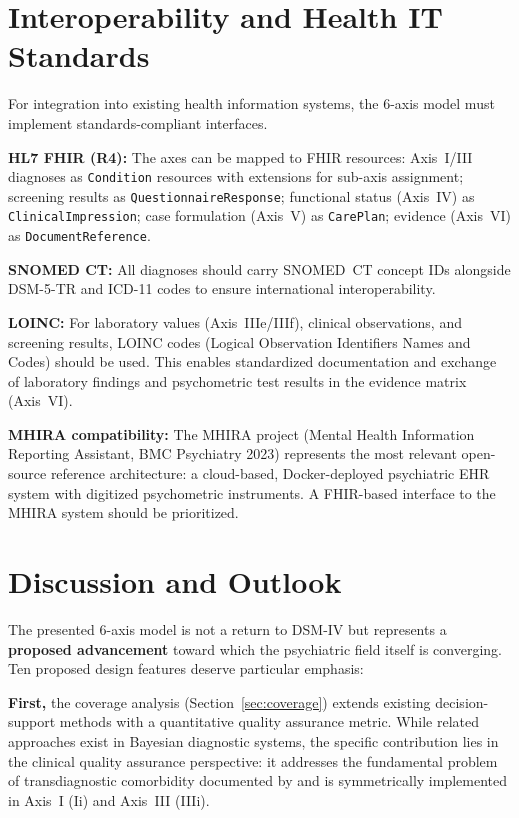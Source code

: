 \documentclass[11pt,a4paper]{article}
\begin{document}
\section{Interoperability and Health IT Standards}
\label{sec:interop}

For integration into existing health information systems, the 6-axis model must implement standards-compliant interfaces.

\textbf{HL7 FHIR (R4):} The axes can be mapped to FHIR resources: Axis~I/III diagnoses as \texttt{Condition} resources with extensions for sub-axis assignment; screening results as \texttt{QuestionnaireResponse}; functional status (Axis~IV) as \texttt{ClinicalImpression}; case formulation (Axis~V) as \texttt{CarePlan}; evidence (Axis~VI) as \texttt{DocumentReference}.

\textbf{SNOMED CT:} All diagnoses should carry SNOMED~CT concept IDs alongside DSM-5-TR and ICD-11 codes to ensure international interoperability.

\textbf{LOINC:} For laboratory values (Axis~IIIe/IIIf), clinical observations, and screening results, LOINC codes (Logical Observation Identifiers Names and Codes) should be used. This enables standardized documentation and exchange of laboratory findings and psychometric test results in the evidence matrix (Axis~VI).

\textbf{MHIRA compatibility:} The MHIRA project (Mental Health Information Reporting Assistant, BMC Psychiatry 2023) represents the most relevant open-source reference architecture: a cloud-based, Docker-deployed psychiatric EHR system with digitized psychometric instruments. A FHIR-based interface to the MHIRA system should be prioritized.

\section{Discussion and Outlook}
\label{sec:discussion}

The presented 6-axis model is not a return to DSM-IV but represents a \textbf{proposed advancement} toward which the psychiatric field itself is converging. Ten proposed design features deserve particular emphasis:

\textbf{First,} the coverage analysis (Section~\ref{sec:coverage}) extends existing decision-support methods with a quantitative quality assurance metric. While related approaches exist in Bayesian diagnostic systems, the specific contribution lies in the clinical quality assurance perspective: it addresses the fundamental problem of transdiagnostic comorbidity documented by \citet{PlanaRipoll2019} and is symmetrically implemented in Axis~I (Ii) and Axis~III (IIIi).
\end{document}
